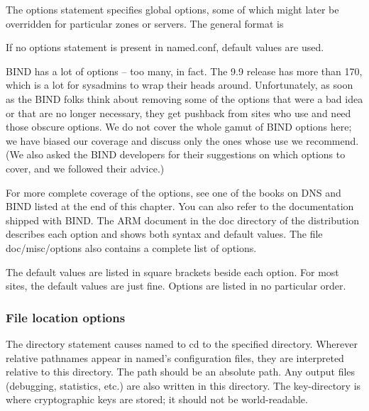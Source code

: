\protect\hypertarget{part0024_split_037.htmlux5cux23_idIndexMarker2120}{}{}The
{options} statement specifies global options, some of which might later
be overridden for particular zones or servers. The general format is


If no {options} statement is present in {named.conf}, default values are
used.

BIND has a lot of options -- too many, in fact. The 9.9 release has more
than 170, which is a lot for sysadmins to wrap their heads around.
Unfortunately, as soon as the BIND folks think about removing some of
the options that were a bad idea or that are no longer necessary, they
get pushback from sites who use and need those obscure options. We do
not cover the whole gamut of BIND options here; we have biased our
coverage and discuss only the ones whose use we recommend. (We also
asked the BIND developers for their suggestions on which options to
cover, and we followed their advice.)

For more complete coverage of the options, see one of the books on DNS
and BIND listed at the end of this chapter. You can also refer to the
documentation shipped with BIND. The {ARM} document in the {doc}
directory of the distribution describes each option and shows both
syntax and default values. The file {doc/misc/options} also contains a
complete list of options.

The default values are listed in square brackets beside each option. For
most sites, the default values are just fine. Options are listed in no
particular order.

\subsubsection{File location options}


The
\protect\hypertarget{part0024_split_037.htmlux5cux23_idIndexMarker2121}{}{}{directory}
statement causes {named} to {cd} to the specified directory. Wherever
relative pathnames appear in {named}'s configuration files, they are
interpreted relative to this directory. The {path} should be an absolute
path. Any output files (debugging, statistics, etc.) are also written in
this directory. The
\protect\hypertarget{part0024_split_037.htmlux5cux23_idIndexMarker2122}{}{}{key-directory}
is where cryptographic keys are stored; it should not be world-readable.

